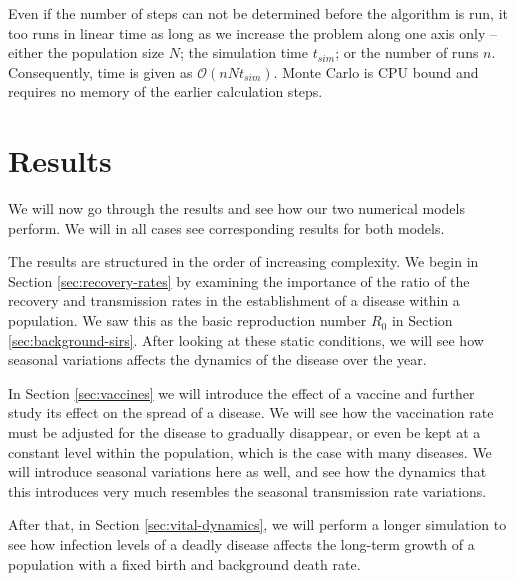 \documentclass[]{article}
\begin{document}
Even if the number of steps can not be determined before the algorithm is run, it too runs in linear time as long as we increase the problem along one axis only -- either the population size $N$; the simulation time $t_{sim}$; or the number of runs $n$. Consequently, time is given as $\mathcal{O}(nNt_{sim})$. Monte Carlo is CPU bound and requires no memory of the earlier calculation steps.


\section{Results} \label{sec:results}

We will now go through the results and see how our two numerical models perform. We will in all cases see corresponding results for both models. 

The results are structured in the order of increasing complexity. We begin in Section \ref{sec:recovery-rates} by examining the importance of the ratio of the recovery and transmission rates in the establishment of a disease within a population. We saw this as the basic reproduction number $R_0$ in Section \ref{sec:background-sirs}. After looking at these static conditions, we will see how seasonal variations affects the dynamics of the disease over the year.

In Section \ref{sec:vaccines} we will introduce the effect of a vaccine and further study its effect on the spread of a disease. We will see how the vaccination rate must be adjusted for the disease to gradually disappear, or even be kept at a constant level within the population, which is the case with many diseases. We will introduce seasonal variations here as well, and see how the dynamics that this introduces very much resembles the seasonal transmission rate variations.

After that, in Section \ref{sec:vital-dynamics}, we will perform a longer simulation to see how infection levels of a deadly disease affects the long-term growth of a population with a fixed birth and background death rate.
\end{document}

